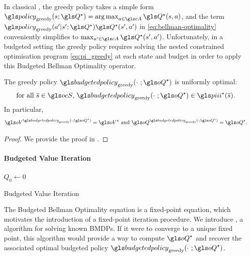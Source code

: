 \begin{remark}
	\begin{leftbar}[remarkbar]
	\label{rmk:greedy}
	In classical , the greedy policy takes a simple form $\policy_\text{greedy}(s; \Q^{\star}) = \argmax_{a\in\cA} \Q^{\star}(s, a)$, and the term $\policy_\text{greedy}(a'|s';\Q^{\star}) \Q^{\star}(s', a')$ in \eqref{eq:bellman-optimality} conveniently simplifies to $\max_{a'\in \cA} \Q^{\star}(s', a')$. Unfortunately, in a budgeted setting the greedy policy requires solving the nested constrained optimisation program \eqref{eq:pi_greedy} at each state and budget in order to apply this Budgeted Bellman Optimality operator.
	\end{leftbar}
\end{remark}

\begin{proposition}
	\begin{leftbar}[propositionbar]
	\label{prop:greedy_optimal}
	The greedy policy $\budgetedpolicy_\text{greedy}(\cdot~; \oQ^{\star})$ is {uniformly} optimal: 
	\begin{equation*}
	\text{for all }\os\in\ocS,\,\budgetedpolicy_\text{greedy}(\cdot~; \oQ^{\star})\in\policies^{\star}(\os). 
	\end{equation*}
	In particular, 
	$$\oV^{\budgetedpolicy_\text{greedy}(\cdot; \oQ^{\star})} = \oV^{\star} \text{ and } \oQ^{\budgetedpolicy_\text{greedy}(\cdot; \oQ^{\star})}= \oQ^{\star}.$$
	\end{leftbar}
\end{proposition}
\begin{proof}
	We provide the proof in .
\end{proof}

\paragraph{Budgeted Value Iteration}


\begin{algorithm}
	\DontPrintSemicolon
	$Q_{0} \leftarrow 0$\;
	\caption{Budgeted Value Iteration}
	\label{alg:bvi}
\end{algorithm}

The Budgeted Bellman Optimality equation is a fixed-point equation, which motivates the introduction of a fixed-point iteration procedure. We introduce , a  algorithm for solving known \glspl{BMDP}. If it were to converge to a unique fixed point, this algorithm would provide a way to compute $\oQ^{\star}$ and recover the associated optimal budgeted policy $\budgetedpolicy_\text{greedy}(\cdot~; \oQ^{\star})$.


